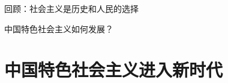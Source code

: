回顾：社会主义是历史和人民的选择
\begin{question}
    中国特色社会主义如何发展？
\end{question}
\section{中国特色社会主义进入新时代}%
\label{sec:中国特色社会主义进入新时代}

